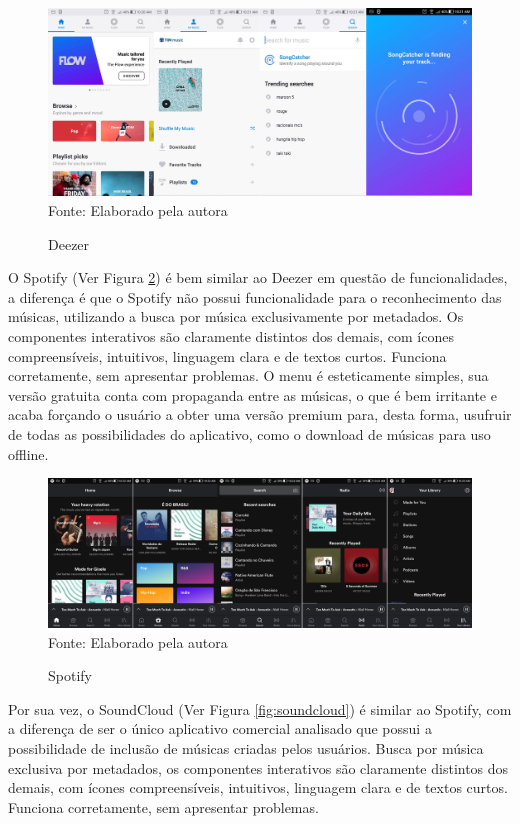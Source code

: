 \begin{figure}[!htb]
   \centering
   \caption{Deezer}\label{fig:deezer} 
   \includegraphics[scale=0.13]{figuras/deezer.jpg}
   \\Fonte: Elaborado pela autora
\end{figure}

O Spotify (Ver Figura \ref{fig:spotify}) é bem similar ao Deezer em questão de funcionalidades, a diferença é que o Spotify não possui funcionalidade para o reconhecimento das músicas, utilizando a busca por música exclusivamente por metadados. Os componentes interativos são claramente distintos dos demais, com ícones compreensíveis, intuitivos, linguagem clara e de textos curtos. Funciona corretamente, sem apresentar problemas. O menu é esteticamente simples, sua versão gratuita conta com propaganda entre as músicas, o que é bem irritante e acaba forçando o usuário a obter uma versão premium para, desta forma, usufruir de todas as possibilidades do aplicativo, como o download de músicas para uso offline.

\begin{figure}[!htb]
   \centering
   \caption{Spotify}\label{fig:spotify} 
   \includegraphics[scale=0.10]{figuras/spotify.jpg}
   \\Fonte: Elaborado pela autora
\end{figure}

Por sua vez, o SoundCloud (Ver Figura \ref{fig:soundcloud}) é similar ao Spotify, com a diferença de ser o único aplicativo comercial analisado que possui a possibilidade de inclusão de músicas criadas pelos usuários. Busca por música exclusiva por metadados, os componentes interativos são claramente distintos dos demais, com ícones compreensíveis, intuitivos, linguagem clara e de textos curtos. Funciona corretamente, sem apresentar problemas.

